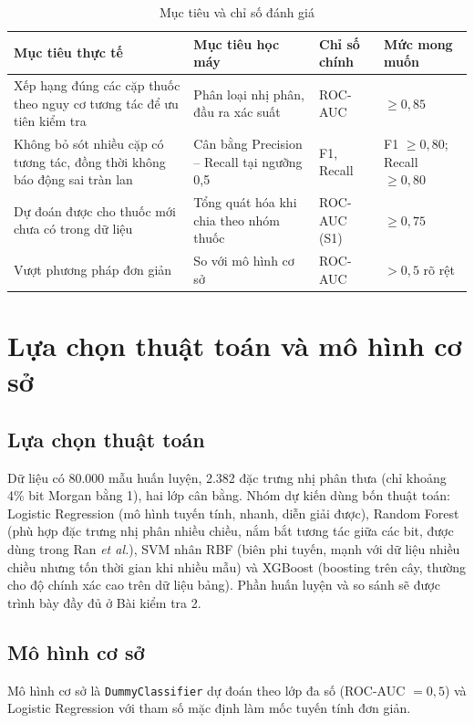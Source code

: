\documentclass[12pt,a4paper,oneside]{report}
\begin{document}
\begin{table}[H]
  \centering
  \caption{Mục tiêu và chỉ số đánh giá}
  \label{tab:muctieu}
  \begin{tabularx}{\textwidth}{>{\raggedright\arraybackslash}X >{\raggedright\arraybackslash}X
                               >{\centering\arraybackslash}p{2.6cm} >{\centering\arraybackslash}p{2.6cm}}
    \toprule
    \textbf{Mục tiêu thực tế} & \textbf{Mục tiêu học máy} & \textbf{Chỉ số chính} & \textbf{Mức mong muốn} \\
    \midrule
    Xếp hạng đúng các cặp thuốc theo nguy cơ tương tác để ưu tiên kiểm tra & Phân loại nhị phân, đầu ra xác suất & ROC-AUC & $\geq 0{,}85$ \\
    Không bỏ sót nhiều cặp có tương tác, đồng thời không báo động sai tràn lan & Cân bằng Precision -- Recall tại ngưỡng 0,5 & F1, Recall & F1 $\geq 0{,}80$; Recall $\geq 0{,}80$ \\
    Dự đoán được cho thuốc mới chưa có trong dữ liệu & Tổng quát hóa khi chia theo nhóm thuốc & ROC-AUC (S1) & $\geq 0{,}75$ \\
    Vượt phương pháp đơn giản & So với mô hình cơ sở & ROC-AUC & $>0{,}5$ rõ rệt \\
    \bottomrule
  \end{tabularx}
\end{table}

\section{Lựa chọn thuật toán và mô hình cơ sở}

\subsection{Lựa chọn thuật toán}
Dữ liệu có 80.000 mẫu huấn luyện, 2.382 đặc trưng nhị phân thưa (chỉ khoảng
4\% bit Morgan bằng 1), hai lớp cân bằng. Nhóm dự kiến dùng bốn thuật toán:
Logistic Regression (mô hình tuyến tính, nhanh, diễn giải được), Random Forest
(phù hợp đặc trưng nhị phân nhiều chiều, nắm bắt tương tác giữa các bit, được
dùng trong Ran \textit{et al.}), SVM nhân RBF (biên phi tuyến, mạnh với dữ liệu
nhiều chiều nhưng tốn thời gian khi nhiều mẫu) và XGBoost (boosting trên cây,
thường cho độ chính xác cao trên dữ liệu bảng). Phần huấn luyện và so sánh sẽ
được trình bày đầy đủ ở Bài kiểm tra 2.

\subsection{Mô hình cơ sở}
Mô hình cơ sở là \texttt{DummyClassifier} dự đoán theo lớp đa số (ROC-AUC $=0{,}5$)
và Logistic Regression với tham số mặc định làm mốc tuyến tính đơn giản.
\end{document}
